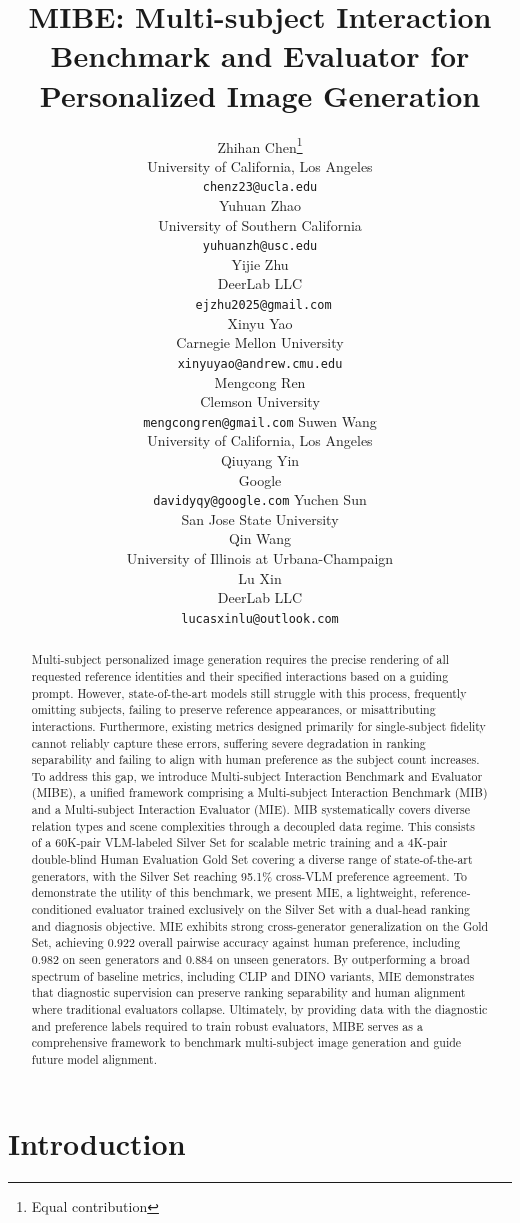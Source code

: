\documentclass{article}
\title{MIBE: Multi-subject Interaction Benchmark and Evaluator for Personalized Image Generation}
\author{%
    Zhihan Chen\thanks{Equal contribution}\\
    University of California, Los Angeles\\
    \texttt{chenz23@ucla.edu}\\
    \AND
    Yuhuan Zhao\footnotemark[1]\\
    University of Southern California\\
    \texttt{yuhuanzh@usc.edu}\\
    \AND
    Yijie Zhu\footnotemark[1]\\
    DeerLab LLC\\
    \texttt{ ejzhu2025@gmail.com}\\
    \AND
    Xinyu Yao\footnotemark[1] \\
    Carnegie Mellon University\\
    \texttt{xinyuyao@andrew.cmu.edu} \\
    \AND
    Mengcong Ren\\
    Clemson University\\
    \texttt{mengcongren@gmail.com}
    \AND
    Suwen Wang\\
    University of California, Los Angeles\\
    \AND
    Qiuyang Yin\\
    Google\\
    \texttt{davidyqy@google.com}
    \AND
    Yuchen Sun\\
    San Jose State University\\
    \AND
    Qin Wang\\
    University of Illinois at Urbana-Champaign\\
    \AND 
    Lu Xin\\
    DeerLab LLC\\
    \texttt{lucasxinlu@outlook.com}
}
\begin{document}
\maketitle


\begin{abstract}
Multi-subject personalized image generation requires the precise rendering of all requested reference identities and their specified interactions based on a guiding prompt. However, state-of-the-art models still struggle with this process, frequently omitting subjects, failing to preserve reference appearances, or misattributing interactions. Furthermore, existing metrics designed primarily for single-subject fidelity cannot reliably capture these errors, suffering severe degradation in ranking separability and failing to align with human preference as the subject count increases. To address this gap, we introduce Multi-subject Interaction Benchmark and Evaluator (MIBE), a unified framework comprising a Multi-subject Interaction Benchmark (MIB) and a Multi-subject Interaction Evaluator (MIE). MIB systematically covers diverse relation types and scene complexities through a decoupled data regime. This consists of a 60K-pair VLM-labeled Silver Set for scalable metric training and a 4K-pair double-blind Human Evaluation Gold Set covering a diverse range of state-of-the-art generators, with the Silver Set reaching 95.1\% cross-VLM preference agreement. To demonstrate the utility of this benchmark, we present MIE, a lightweight, reference-conditioned evaluator trained exclusively on the Silver Set with a dual-head ranking and diagnosis objective. MIE exhibits strong cross-generator generalization on the Gold Set, achieving 0.922 overall pairwise accuracy against human preference, including 0.982 on seen generators and 0.884 on unseen generators. By outperforming a broad spectrum of baseline metrics, including CLIP and DINO variants, MIE demonstrates that diagnostic supervision can preserve ranking separability and human alignment where traditional evaluators collapse. Ultimately, by providing data with the diagnostic and preference labels required to train robust evaluators, MIBE serves as a comprehensive framework to benchmark multi-subject image generation and guide future model alignment.
\end{abstract}

\section{Introduction}
\end{document}
